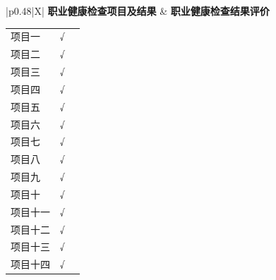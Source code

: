 \documentclass[UTF8,10pt,a4paper,fontset=fandol]{ctexart}
\newcommand{\fieldvalue}[1]{#1}
\newcommand{\handwritten}[1]{#1}
\begin{document}
\begin{tabularx}{\textwidth}{|p{0.48\textwidth}|X|}
\hline
\textbf{职业健康检查项目及结果} &
\textbf{职业健康检查结果评价} \\
\hline
{\begin{tabularx}{\linewidth}{@{}lXr@{}}
项目一 &
\fieldvalue{\handwritten{√}} & \\[0.25em]
项目二 &
\fieldvalue{\handwritten{√}} & \\[0.25em]
项目三 &
\fieldvalue{\handwritten{√}} & \\[0.25em]
项目四 &
\fieldvalue{\handwritten{√}} & \\[0.25em]
项目五 &
\fieldvalue{\handwritten{√}} & \\[0.25em]
项目六 &
\fieldvalue{\handwritten{√}} & \\[0.25em]
项目七 &
\fieldvalue{\handwritten{√}} & \\[0.25em]
项目八 &
\fieldvalue{\handwritten{√}} & \\[0.25em]
项目九 &
\fieldvalue{\handwritten{√}} & \\[0.25em]
项目十 &
\fieldvalue{\handwritten{√}} & \\[0.25em]
项目十一 &
\fieldvalue{\handwritten{√}} & \\[0.25em]
项目十二 &
\fieldvalue{\handwritten{√}} & \\[0.25em]
项目十三 &
\fieldvalue{\handwritten{√}} & \\[0.25em]
项目十四 &
\fieldvalue{\handwritten{√}} & \\[0.25em]

\end{tabularx}}
\end{tabularx}
\end{document}

